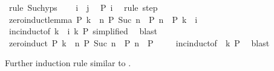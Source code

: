 \begin{isabellebody}
\ {\isacharparenleft}{\kern0pt}rule\ Suc{\isachardot}{\kern0pt}hyps{\isacharparenright}{\kern0pt}\isanewline
\ \ \isamarkupfalse%
\ {\isacartoucheopen}i\ {\isacharless}{\kern0pt}\ j{\isacartoucheclose}\ \isamarkupfalse%
\ {\isachardoublequoteopen}P\ i{\isachardoublequoteclose}\ \isamarkupfalse%
\ {\isacharparenleft}{\kern0pt}rule\ step{\isacharparenright}{\kern0pt}\isanewline
{}\isamarkupfalse%
%
\endisatagproof
{\isafoldproof}%
%
\isadelimproof
\isanewline
%
\endisadelimproof
\isanewline
{}\isamarkupfalse%
\ zero{\isacharunderscore}{\kern0pt}induct{\isacharunderscore}{\kern0pt}lemma{\isacharcolon}{\kern0pt}\ {\isachardoublequoteopen}P\ k\ {\isasymLongrightarrow}\ {\isacharparenleft}{\kern0pt}{\isasymAnd}n{\isachardot}{\kern0pt}\ P\ {\isacharparenleft}{\kern0pt}Suc\ n{\isacharparenright}{\kern0pt}\ {\isasymLongrightarrow}\ P\ n{\isacharparenright}{\kern0pt}\ {\isasymLongrightarrow}\ P\ {\isacharparenleft}{\kern0pt}k\ {\isacharminus}{\kern0pt}\ i{\isacharparenright}{\kern0pt}{\isachardoublequoteclose}\isanewline
%
\isadelimproof
\ \ %
\endisadelimproof
%
\isatagproof
{}\isamarkupfalse%
\ inc{\isacharunderscore}{\kern0pt}induct{\isacharbrackleft}{\kern0pt}of\ {\isachardoublequoteopen}k\ {\isacharminus}{\kern0pt}\ i{\isachardoublequoteclose}\ k\ P{\isacharcomma}{\kern0pt}\ simplified{\isacharbrackright}{\kern0pt}\ \isamarkupfalse%
\ blast%
\endisatagproof
{\isafoldproof}%
%
\isadelimproof
\isanewline
%
\endisadelimproof
\isanewline
{}\isamarkupfalse%
\ zero{\isacharunderscore}{\kern0pt}induct{\isacharcolon}{\kern0pt}\ {\isachardoublequoteopen}P\ k\ {\isasymLongrightarrow}\ {\isacharparenleft}{\kern0pt}{\isasymAnd}n{\isachardot}{\kern0pt}\ P\ {\isacharparenleft}{\kern0pt}Suc\ n{\isacharparenright}{\kern0pt}\ {\isasymLongrightarrow}\ P\ n{\isacharparenright}{\kern0pt}\ {\isasymLongrightarrow}\ P\ {}{\isachardoublequoteclose}\isanewline
%
\isadelimproof
\ \ %
\endisadelimproof
%
\isatagproof
{}\isamarkupfalse%
\ inc{\isacharunderscore}{\kern0pt}induct{\isacharbrackleft}{\kern0pt}of\ {}\ k\ P{\isacharbrackright}{\kern0pt}\ \isamarkupfalse%
\ blast%
\endisatagproof
{\isafoldproof}%
%
\isadelimproof
%
\endisadelimproof
%
\begin{isamarkuptext}%
Further induction rule similar to .%

\end{isamarkuptext}
\end{isabellebody}
